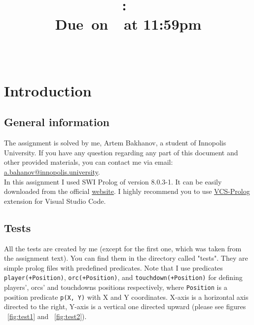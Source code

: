 \documentclass{article}
\title{
    \vspace{2in}
    \textmd{\textbf{\hmwkClass:\ \hmwkTitle}}\\
    \normalsize\vspace{0.1in}\small{Due\ on\ \hmwkDueDate\ at 11:59pm}\\
    \vspace{0.1in}\large{\textit{\hmwkClassInstructor\ }}
    \vspace{3in}
}
\author{\hmwkAuthorName}
\date{}
\begin{document}
\maketitle

\pagebreak

\tableofcontents

\pagebreak

\section{Introduction}
\subsection{General information}
    The assignment is solved by me, Artem Bakhanov, a student of Innopolis University. If you have any question regarding any part of this document and other provided materials, you can contact me via email: \href{mailto:a.bahanov@innopolis.university}{a.bahanov@innopolis.university}.\\
    In this assignment I used SWI Prolog of version 8.0.3-1. It can be easily downloaded from the official \href{https://www.swi-prolog.org/download/stable}{website}. I highly recommend you to use \href{https://marketplace.visualstudio.com/items?itemName=arthurwang.vsc-prolog}{VCS-Prolog} extension for Visual Studio Code. 
\subsection{Tests}
All the tests are created by me (except for the first one, which was taken from the assignment text). You can find them in the directory called "tests". They are simple prolog files with predefined predicates. Note that I use predicates \texttt{player(+Position)}, \texttt{orc(+Position)}, and \texttt{touchdown(+Position)} for defining players', orcs' and touchdowns positions respectively, where \texttt{Position} is a position predicate \texttt{p(X, Y)} with X and Y coordinates. X-axis is a horizontal axis directed to the right, Y-axis is a vertical one directed upward (please see figures ~\ref{fig:test1} and ~\ref{fig:test2}). 

\end{document}
